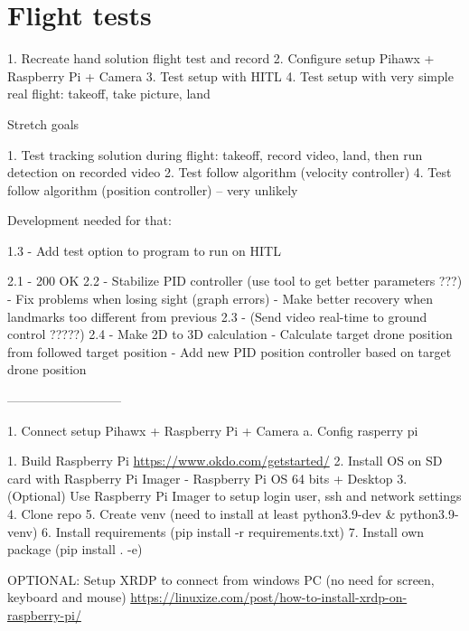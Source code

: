 \section{Flight tests}

1. Recreate hand solution flight test and record
2. Configure setup Pihawx + Raspberry Pi + Camera
3. Test setup with HITL
4. Test setup with very simple real flight: takeoff, take picture, land

Stretch goals

1. Test tracking solution during flight: takeoff, record video, land, then run detection on recorded video
2. Test follow algorithm (velocity controller)
4. Test follow algorithm (position controller) -- very unlikely



Development needed for that:

1.3 - Add test option to program to run on HITL

2.1 - 200 OK
2.2 - Stabilize PID controller (use tool to get better parameters ???)
    - Fix problems when losing sight (graph errors)
    - Make better recovery when landmarks too different from previous
2.3 - (Send video real-time to ground control ?????)
2.4 - Make 2D to 3D calculation
    - Calculate target drone position from followed target position
    - Add new PID position controller based on target drone position
    
    
    
    
    ---------------------------
    
1. Connect setup Pihawx + Raspberry Pi + Camera
    a. Config rasperry pi
        
        1. Build Raspberry Pi \url{https://www.okdo.com/getstarted/}
        2. Install OS on SD card with Raspberry Pi Imager - Raspberry Pi OS 64 bits + Desktop 
        3. (Optional) Use Raspberry Pi Imager to setup login user, ssh and network settings
        4. Clone repo
        5. Create venv (need to install at least python3.9-dev & python3.9-venv)
        6. Install requirements (pip install -r requirements.txt) 
        7. Install own package (pip install . -e)
        
        OPTIONAL: Setup XRDP to connect from windows PC (no need for screen, keyboard and mouse)
        \url{https://linuxize.com/post/how-to-install-xrdp-on-raspberry-pi/}
        
